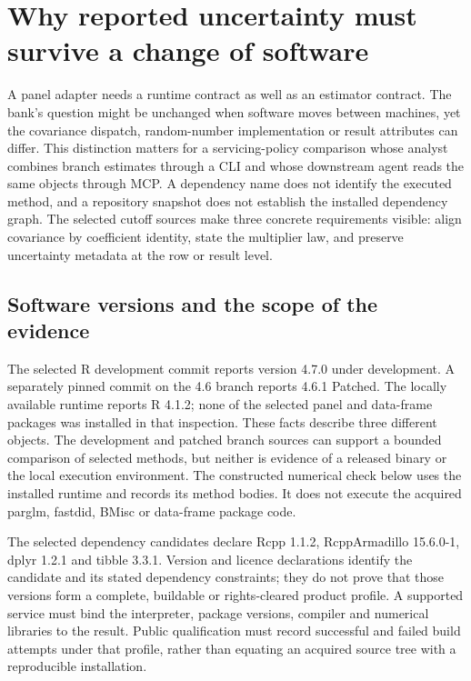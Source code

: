 \section{Why reported uncertainty must survive a change of software}
\label{sec:exec29-panel-runtime-semantics}

A panel adapter needs a runtime contract as well as an estimator contract. The bank's question might be unchanged when software moves between machines, yet the covariance dispatch, random-number implementation or result attributes can differ. This distinction matters for a servicing-policy comparison whose analyst combines branch estimates through a CLI and whose downstream agent reads the same objects through MCP. A dependency name does not identify the executed method, and a repository snapshot does not establish the installed dependency graph. The selected cutoff sources make three concrete requirements visible: align covariance by coefficient identity, state the multiplier law, and preserve uncertainty metadata at the row or result level.\citep{exec29_panel_runtime_sources}

\subsection{Software versions and the scope of the evidence}

The selected R development commit reports version 4.7.0 under development. A separately pinned commit on the 4.6 branch reports 4.6.1 Patched. The locally available runtime reports R 4.1.2; none of the selected panel and data-frame packages was installed in that inspection. These facts describe three different objects. The development and patched branch sources can support a bounded comparison of selected methods, but neither is evidence of a released binary or the local execution environment. The constructed numerical check below uses the installed runtime and records its method bodies. It does not execute the acquired parglm, fastdid, BMisc or data-frame package code.\citep{exec29_panel_runtime_sources,exec29_panel_runtime_reference}

The selected dependency candidates declare Rcpp 1.1.2, RcppArmadillo 15.6.0-1, dplyr 1.2.1 and tibble 3.3.1. Version and licence declarations identify the candidate and its stated dependency constraints; they do not prove that those versions form a complete, buildable or rights-cleared product profile. A supported service must bind the interpreter, package versions, compiler and numerical libraries to the result. Public qualification must record successful and failed build attempts under that profile, rather than equating an acquired source tree with a reproducible installation.\citep{exec29_panel_runtime_sources}

